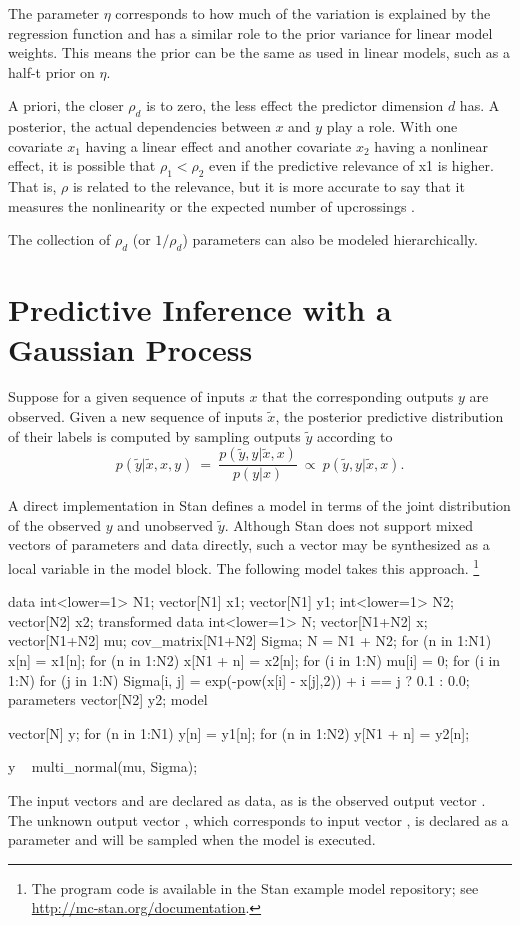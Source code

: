 The parameter $\eta$ corresponds to how much of the variation is
explained by the regression function and has a similar role to the
prior variance for linear model weights.  This means the prior can be
the same as used in linear models, such as a half-t prior on $\eta$.

A priori, the closer $\rho_d$ is to zero, the less effect the
predictor dimension $d$ has.  A posterior, the actual dependencies
between $x$ and $y$ play a role.  With one covariate $x_1$ having a
linear effect and another covariate $x_2$ having a nonlinear effect,
it is possible that $\rho_1 < \rho_2$ even if the predictive relevance
of x1 is higher. That is, $\rho$ is related to the relevance, but it
is more accurate to say that it measures the nonlinearity or the
expected number of upcrossings \cite[page~80]{RasmussenWilliams:2006}.

The collection of $\rho_d$ (or $1/\rho_d$) parameters can also be
modeled hierarchically.


\section{Predictive Inference with a Gaussian Process}

Suppose for a given sequence of inputs $x$ that the corresponding
outputs $y$ are observed.  Given a new sequence of inputs $\tilde{x}$,
the posterior predictive distribution of their labels is computed by
sampling outputs $\tilde{y}$ according to
\[
p(\tilde{y}|\tilde{x},x,y)
\ = \
\frac{p(\tilde{y}, y|\tilde{x},x)}
     {p(y|x)}
\ \propto \
p(\tilde{y}, y|\tilde{x},x).
\]

A direct implementation in Stan defines a model in terms of the
joint distribution of the observed $y$ and unobserved $\tilde{y}$.
Although Stan does not support mixed vectors of parameters and data
directly, such a vector may be synthesized as a local variable in the
model block.  The following model takes this approach.%
%
\footnote{The program code is available in the Stan example model repository;
see \url{http://mc-stan.org/documentation}.}
%
\begin{stancode}
data {
  int<lower=1> N1;     
  vector[N1] x1; 
  vector[N1] y1;
  int<lower=1> N2;
  vector[N2] x2;
}
transformed data {
  int<lower=1> N;
  vector[N1+N2] x;
  vector[N1+N2] mu;
  cov_matrix[N1+N2] Sigma;
  N = N1 + N2;
  for (n in 1:N1) x[n] = x1[n];
  for (n in 1:N2) x[N1 + n] = x2[n];
  for (i in 1:N) mu[i] = 0;
  for (i in 1:N) 
    for (j in 1:N)
      Sigma[i, j] = exp(-pow(x[i] - x[j],2)) 
                    + i == j ? 0.1 : 0.0;
}
parameters {
  vector[N2] y2;
}
model {
  vector[N] y;
  for (n in 1:N1) y[n] = y1[n];
  for (n in 1:N2) y[N1 + n] = y2[n];

  y ~ multi_normal(mu, Sigma);
}
\end{stancode}
%
The input vectors  and  are declared as data, as is
the observed output vector .  The unknown output vector
\code{y2}, which corresponds to input vector \code{x2}, is declared as
a parameter and will be sampled when the model is executed.  

